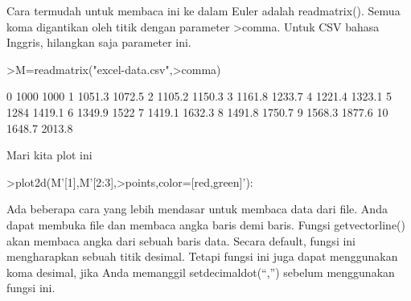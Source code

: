 \documentclass{article}
\begin{document}
\begin{eulernotebook}
\begin{eulercomment}
Cara termudah untuk membaca ini ke dalam Euler adalah readmatrix().
Semua koma digantikan oleh titik dengan parameter \textgreater{}comma. Untuk CSV
bahasa Inggris, hilangkan saja parameter ini.
\end{eulercomment}
\begin{eulerprompt}
>M=readmatrix("excel-data.csv",>comma)
\end{eulerprompt}
\begin{euleroutput}
          0      1000      1000 
          1    1051.3    1072.5 
          2    1105.2    1150.3 
          3    1161.8    1233.7 
          4    1221.4    1323.1 
          5      1284    1419.1 
          6    1349.9      1522 
          7    1419.1    1632.3 
          8    1491.8    1750.7 
          9    1568.3    1877.6 
         10    1648.7    2013.8 
\end{euleroutput}
\begin{eulercomment}
Mari kita plot ini
\end{eulercomment}
\begin{eulerprompt}
>plot2d(M'[1],M'[2:3],>points,color=[red,green]'):
\end{eulerprompt}
\begin{eulercomment}
Ada beberapa cara yang lebih mendasar untuk membaca data dari file.
Anda dapat membuka file dan membaca angka baris demi baris. Fungsi
getvectorline() akan membaca angka dari sebuah baris data. Secara
default, fungsi ini mengharapkan sebuah titik desimal. Tetapi fungsi
ini juga dapat menggunakan koma desimal, jika Anda memanggil
setdecimaldot(“,”) sebelum menggunakan fungsi ini.


\end{eulercomment}
\end{eulernotebook}
\end{document}
